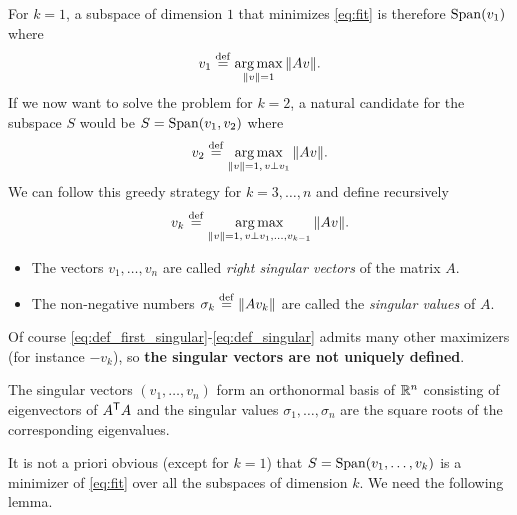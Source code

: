 \documentclass[11pt,nocut]{article}
\begin{document}
For $k=1$, a subspace of dimension $1$ that minimizes \eqref{eq:fit} is therefore ${{\rm Span}}(v_1)$ where
\begin{equation}\label{eq:def_first_singular}
	v_1 \overset{\rm def}{=} \operatorname*{arg\,max}_{\|v\| = 1} \|A v\|.
\end{equation}
If we now want to solve the problem for $k=2$, a natural candidate for the subspace $S$ would be $S = {{\rm Span}}(v_1, v_2)$ where
\begin{equation}\label{eq:def_second_singular}
	v_2 \overset{\rm def}{=} \operatorname*{arg\,max}_{\|v\| = 1, \, v \perp v_1} \| A v \|.
\end{equation}
We can follow this greedy strategy for $k = 3, \dots, n$ and define recursively
\begin{equation}\label{eq:def_singular}
	v_{k} \overset{\rm def}{=} \operatorname*{arg\,max}_{\|v\| = 1, \, v \perp v_1, \dots, v_{k-1}} \| A v \|.
\end{equation}
\begin{definition}
	\begin{itemize}
		\item The vectors $v_1, \dots, v_n$ are called \emph{right singular vectors} of the matrix $A$.
		\item The non-negative numbers $\sigma_k \overset{\rm def}{=} \|A v_k\|$ are called the \emph{singular values} of $A$.
	\end{itemize}
\end{definition}
Of course \eqref{eq:def_first_singular}-\eqref{eq:def_singular} admits many other maximizers (for instance $-v_k$), so \textbf{the singular vectors are not uniquely defined}.

\begin{proposition}\label{prop:right_eigen}
	The singular vectors $(v_1, \dots, v_n)$ form an orthonormal basis of $\mathbb{R}^n$ consisting of eigenvectors of $A^{{\sf T}} A$ and the singular values $\sigma_1, \dots, \sigma_n$ are the square roots of the corresponding eigenvalues.
\end{proposition}

It is not a priori obvious (except for $k=1$) that $S = {{\rm Span}}(v_1, \dots, v_k)$ is a minimizer of \eqref{eq:fit} over all the subspaces of dimension $k$.
We need the following lemma.
\end{document}
